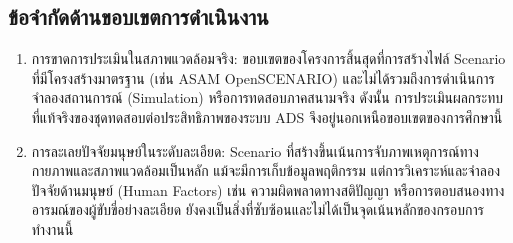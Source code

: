 \subsection{ข้อจำกัดด้านขอบเขตการดำเนินงาน}\label{subsec:scope-limitations}

\begin{enumerate}
    \item การขาดการประเมินในสภาพแวดล้อมจริง: ขอบเขตของโครงการสิ้นสุดที่การสร้างไฟล์ Scenario ที่มีโครงสร้างมาตรฐาน (เช่น ASAM OpenSCENARIO) และไม่ได้รวมถึงการดำเนินการจำลองสถานการณ์ (Simulation) หรือการทดสอบภาคสนามจริง ดังนั้น การประเมินผลกระทบที่แท้จริงของชุดทดสอบต่อประสิทธิภาพของระบบ ADS จึงอยู่นอกเหนือขอบเขตของการศึกษานี้
    \item การละเลยปัจจัยมนุษย์ในระดับละเอียด: Scenario ที่สร้างขึ้นเน้นการจับภาพเหตุการณ์ทางกายภาพและสภาพแวดล้อมเป็นหลัก แม้จะมีการเก็บข้อมูลพฤติกรรม แต่การวิเคราะห์และจำลองปัจจัยด้านมนุษย์ (Human Factors) เช่น ความผิดพลาดทางสติปัญญา หรือการตอบสนองทางอารมณ์ของผู้ขับขี่อย่างละเอียด ยังคงเป็นสิ่งที่ซับซ้อนและไม่ได้เป็นจุดเน้นหลักของกรอบการทำงานนี้
\end{enumerate}